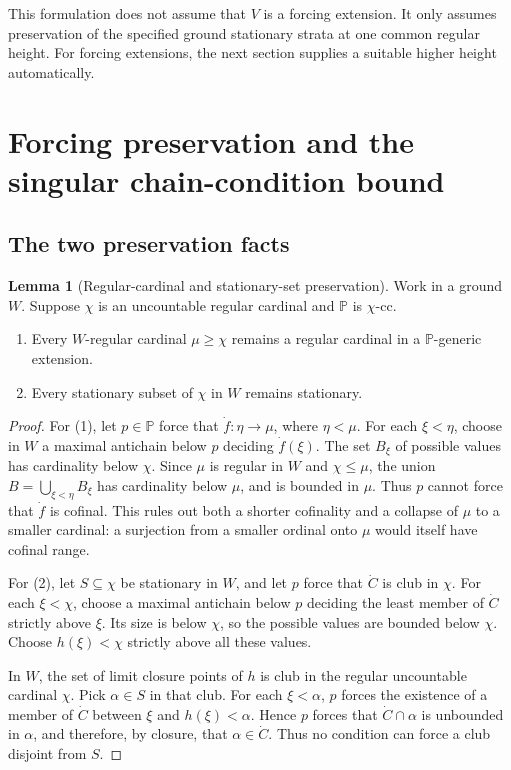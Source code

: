 \documentclass[11pt,letterpaper]{article}
\theoremstyle{definition}
\newtheorem{lemma}[definition]{Lemma}
\numberwithin{equation}{section}
\newcommand{\PP}{\mathbb P}
\newcommand{\cc}{\text{-cc}}
\begin{document}
This formulation does not assume that $V$ is a forcing extension. It only assumes preservation of the specified ground stationary strata at one common regular height. For forcing extensions, the next section supplies a suitable higher height automatically.

\section{Forcing preservation and the singular chain-condition bound}\label{sec:forcing}

\subsection{The two preservation facts}

\begin{lemma}[Regular-cardinal and stationary-set preservation]\label{lem:preserve}
Work in a ground $W$. Suppose $\chi$ is an uncountable regular cardinal and $\PP$ is $\chi\cc$.
\begin{enumerate}
\item Every $W$-regular cardinal $\mu\ge\chi$ remains a regular cardinal in a $\PP$-generic extension.
\item Every stationary subset of $\chi$ in $W$ remains stationary.
\end{enumerate}
\end{lemma}
\begin{proof}
For (1), let $p\in\PP$ force that $\dot f:\eta\to\mu$, where $\eta<\mu$. For each $\xi<\eta$, choose in $W$ a maximal antichain below $p$ deciding $\dot f(\xi)$. The set $B_\xi$ of possible values has cardinality below $\chi$. Since $\mu$ is regular in $W$ and $\chi\le\mu$, the union
$B=\bigcup_{\xi<\eta}B_\xi$ has cardinality below $\mu$, and is bounded in $\mu$. Thus $p$ cannot force that $\dot f$ is cofinal. This rules out both a shorter cofinality and a collapse of $\mu$ to a smaller cardinal: a surjection from a smaller ordinal onto $\mu$ would itself have cofinal range.

For (2), let $S\subseteq\chi$ be stationary in $W$, and let $p$ force that $\dot C$ is club in $\chi$. For each $\xi<\chi$, choose a maximal antichain below $p$ deciding the least member of $\dot C$ strictly above $\xi$. Its size is below $\chi$, so the possible values are bounded below $\chi$. Choose $h(\xi)<\chi$ strictly above all these values.

In $W$, the set of limit closure points of $h$ is club in the regular uncountable cardinal $\chi$. Pick $\alpha\in S$ in that club. For each $\xi<\alpha$, $p$ forces the existence of a member of $\dot C$ between $\xi$ and $h(\xi)<\alpha$. Hence $p$ forces that $\dot C\cap\alpha$ is unbounded in $\alpha$, and therefore, by closure, that $\alpha\in\dot C$. Thus no condition can force a club disjoint from $S$.
\end{proof}
\end{document}
